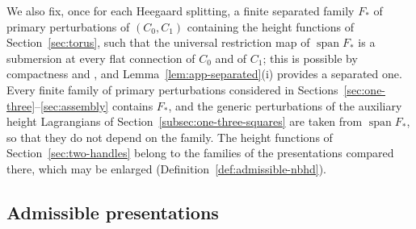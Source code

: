 \documentclass[11pt]{amsart}
\theoremstyle{definition}
\theoremstyle{remark}
\theoremstyle{plain}
\numberwithin{equation}{section}
\begin{document}
We also fix, once for each Heegaard splitting, a finite separated family $F_*$ of primary
perturbations of $(C_0,C_1)$ containing the height functions of Section~\ref{sec:torus}, such
that the universal
restriction map of $\operatorname{span}F_*$ is a submersion at every flat connection of $C_0$ and
of $C_1$; this is possible by compactness and \cite[Section~2.3]{DFL}, and
Lemma~\ref{lem:app-separated}(i) provides a separated one. Every finite family of primary
perturbations considered in Sections~\ref{sec:one-three}--\ref{sec:assembly} contains $F_*$,
and the generic perturbations of the auxiliary height Lagrangians of
Section~\ref{subsec:one-three-squares} are taken from $\operatorname{span}F_*$, so that they do
not depend on the family. The height functions of Section~\ref{sec:two-handles} belong to the
families of the presentations compared there, which may be enlarged
(Definition~\ref{def:admissible-nbhd}).

\subsection{Admissible presentations}\label{subsec:admissible}
\end{document}
